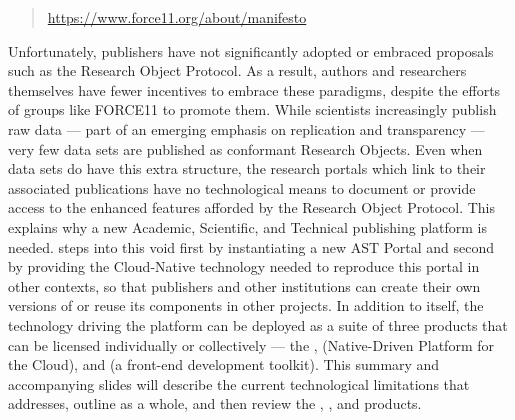 \documentclass[10pt,letterpaper]{article}
\newcommand{\rpdfLink}[1]{\href{#1}{\small{#1}}}
\begin{document}
\begin{quote}{}
\rpdfLink{https://www.force11.org/about/manifesto}
\end{quote}
\vspace{-.5pt}
\p{}
Unfortunately, publishers have not significantly adopted 
or embraced proposals such as the Research Object Protocol.  
As a result, authors and researchers themselves have 
fewer incentives to embrace these paradigms, 
despite the efforts of groups like FORCE11 to promote them.  
While scientists increasingly publish raw data --- part of 
an emerging emphasis on replication 
and transparency --- very few data sets are published 
as conformant Research Objects.  
Even when data sets do have this 
extra structure, the research portals which 
link to their associated publications have 
no technological means to document 
or provide access to the enhanced features 
afforded by the Research Object Protocol.
\p{}
This explains why a new Academic, Scientific, and Technical 
publishing platform is needed.  {\lfMOSAIC} 
steps into this void first by instantiating a new 
AST Portal and second by providing the Cloud-Native 
technology needed to reproduce this portal in 
other contexts, so that publishers and 
other institutions can create their own versions of 
{\MOSAIC} or reuse its components in other projects.
\p{}
In addition to {\MOSAIC} itself, 
the technology driving the platform can be 
deployed as a suite of three products that can 
be licensed individually or collectively --- the
{\MOSAIC} {\SDK}, {\NDPCloud} (Native-Driven Platform 
for the Cloud), and {\VersatileUX} (a front-end 
development toolkit).  
\p{}
This summary and accompanying slides will describe the 
current technological limitations that {\MOSAIC} 
addresses, outline {\MOSAIC} as a whole, 
and then review the {\MOSAIC} {\SDK}, {\NDPCloud}, 
and {\VersatileUX} products.
\p{}
\end{document}
